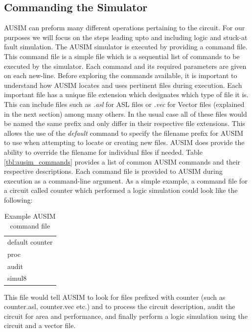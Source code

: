 \documentclass[12pt]{report}
\begin{document}
\subsection{Commanding the Simulator}
AUSIM can preform many different operations pertaining to the circuit.  For our purposes we will focus on the steps leading upto and including logic and stuck-at fault simulation.  The AUSIM simulator is executed by providing a command file.  This command file is a simple file which is a sequential list of commands to be executed by the simulator.  Each command and its required parameters are given on each new-line.  Before exploring the commands available, it is important to understand how AUSIM locates and uses pertinent files during execution.  Each important file has a unique file extension which designates which type of file it is.  This can include files such as \textit{.asl} for ASL files or \textit{.vec} for Vector files (explained in the next section) among many others.  In the usual case all of these files would be named the same prefix and only differ in their respective file extensions.  This allows the use of the \textit{default} command to specify the filename prefix for AUSIM to use when attempting to locate or creating new files.  AUSIM does provide the ability to override the filename for individual files if needed\cite{ausim}.  Table \ref{tbl:ausim_commands} provides a list of common AUSIM commands and their respective descriptions.  Each command file is provided to AUSIM during execution as a command-line argument.  As a simple example, a command file for a circuit called counter which performed a logic simulation could look like the following:
\begin{table}[h]
	\begin{center}
		\begin{tabular}{l}
		default counter \\
		proc \\
		audit \\
		simul8 \\
		\end{tabular}
	\end{center}
	\caption{Example AUSIM command file}
\end{table}
This file would tell AUSIM to look for files prefixed with counter (such as counter.asl, counter.vec etc.) and to process the circuit description, audit the circuit for area and performance, and finally perform a logic simulation using the circuit and a vector file.
\end{document}
